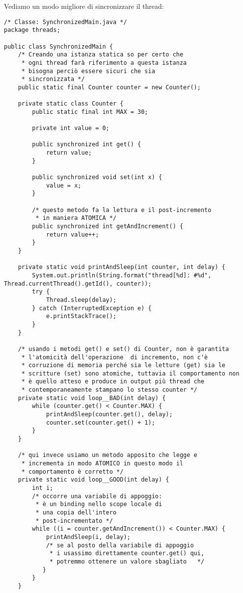 \noindent Vediamo un modo migliore di sincronizzare il thread:

\begin{lstlisting}
/* Classe: SynchronizedMain.java */
package threads;

public class SynchronizedMain {
	/* Creando una istanza statica so per certo che
	 * ogni thread farà riferimento a questa istanza
	 * bisogna perciò essere sicuri che sia 
	 * sincronizzata */ 
    public static final Counter counter = new Counter();

    private static class Counter {
        public static final int MAX = 30;

        private int value = 0;

        public synchronized int get() {
            return value;
        }

        public synchronized void set(int x) {
            value = x;
        }

        /* questo metodo fa la lettura e il post-incremento
         * in maniera ATOMICA */
        public synchronized int getAndIncrement() {
            return value++;
        }
    }

    private static void printAndSleep(int counter, int delay) {
        System.out.println(String.format("thread[%d]: #%d", Thread.currentThread().getId(), counter));
        try {
            Thread.sleep(delay);
        } catch (InterruptedException e) {
            e.printStackTrace();
        }
    }

    /* usando i metodi get() e set() di Counter, non è garantita 
     * l'atomicità dell'operazione  di incremento, non c'è 
     * corruzione di memoria perché sia le letture (get) sia le  
     * scritture (set) sono atomiche, tuttavia il comportamento non  
     * è quello atteso e produce in output più thread che 
     * contemporaneamente stampano lo stesso counter */
    private static void loop__BAD(int delay) {
        while (counter.get() < Counter.MAX) {
            printAndSleep(counter.get(), delay);
            counter.set(counter.get() + 1);
        }
    }

    /* qui invece usiamo un metodo apposito che legge e  
     * incrementa in modo ATOMICO in questo modo il 
     * comportamento è corretto */
    private static void loop__GOOD(int delay) {
        int i;  
        /* occorre una variabile di appoggio: 
         * è un binding nello scope locale di 
         * una copia dell'intero 
         * post-incrementato */
        while ((i = counter.getAndIncrement()) < Counter.MAX) {
            printAndSleep(i, delay);    
            /* se al posto della variabile di appoggio 
             * i usassimo direttamente counter.get() qui,
             * potremmo ottenere un valore sbagliato   */
           }
        }
    }


\end{lstlisting}
